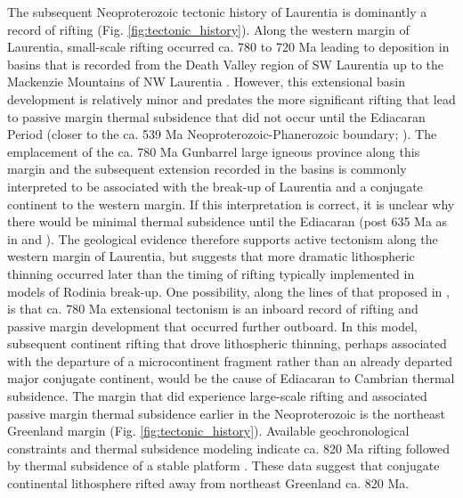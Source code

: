 \documentclass[11pt,letterpaper]{article}
\begin{document}
The subsequent Neoproterozoic tectonic history of Laurentia is dominantly a record of rifting (Fig. \ref{fig:tectonic_history}). Along the western margin of Laurentia, small-scale rifting occurred ca. 780 to 720 Ma leading to deposition in basins that is recorded from the Death Valley region of SW Laurentia up to the Mackenzie Mountains of NW Laurentia \citep{Macdonald2012a, Rooney2017a}. However, this extensional basin development is relatively minor and predates the more significant rifting that lead to passive margin thermal subsidence that did not occur until the Ediacaran Period (closer to the ca. 539 Ma Neoproterozoic-Phanerozoic boundary; \citealp{Bond1984a, Levy1991a}). The emplacement of the ca. 780 Ma Gunbarrel large igneous province along this margin and the subsequent extension recorded in the basins is commonly interpreted to be associated with the break-up of Laurentia and a conjugate continent to the western margin. If this interpretation is correct, it is unclear why there would be minimal thermal subsidence until the Ediacaran (post 635 Ma as in \citealp{Levy1991a} and \citealp{Witkosky2018a}). The geological evidence therefore supports active tectonism along the western margin of Laurentia, but suggests that more dramatic lithospheric thinning occurred later than the timing of rifting typically implemented in models of Rodinia break-up. One possibility, along the lines of that proposed in \citet{Ross1991a}, is that ca. 780 Ma extensional tectonism is an inboard record of rifting and passive margin development that occurred further outboard. In this model, subsequent continent rifting that drove lithospheric thinning, perhaps associated with the departure of a microcontinent fragment rather than an already departed major conjugate continent, would be the cause of Ediacaran to Cambrian thermal subsidence. The margin that did experience large-scale rifting and associated passive margin thermal subsidence earlier in the Neoproterozoic is the northeast Greenland margin (Fig. \ref{fig:tectonic_history}). Available geochronological constraints and thermal subsidence modeling indicate ca. 820 Ma rifting followed by thermal subsidence of a stable platform \citep{Maloof2006a, Halverson2018a}. These data suggest that conjugate continental lithosphere rifted away from northeast Greenland ca. 820 Ma. 
\end{document}
